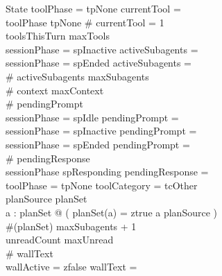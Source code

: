\documentclass[a4paper,10pt,fleqn]{article}
\begin{document}
\begin{schema}{State}
  toolPhase = tpNone \implies currentTool = \emptyset \\
  toolPhase \neq tpNone \implies \# currentTool = 1 \\
  toolsThisTurn \leq maxTools \\
  sessionPhase = spInactive \implies activeSubagents = \emptyset \\
  sessionPhase = spEnded \implies activeSubagents = \emptyset \\
  \# activeSubagents \leq maxSubagents \\
  \# context \leq maxContext \\
  \# pendingPrompt  \\
  sessionPhase = spIdle \implies pendingPrompt = \emptyset \\
  sessionPhase = spInactive \implies pendingPrompt = \emptyset \\
  sessionPhase = spEnded \implies pendingPrompt = \emptyset \\
  \# pendingResponse  \\
  sessionPhase \neq spResponding \implies pendingResponse = \emptyset \\
  toolPhase = tpNone \implies toolCategory = tcOther \\
  \dom planSource \subseteq \dom planSet \\
  \forall a : \dom planSet @ ( planSet(a) = ztrue \iff a \in \dom planSource ) \\
  \#(\dom planSet) \leq maxSubagents + 1 \\
  unreadCount \leq maxUnread \\
  \# wallText  \\
  wallActive = zfalse \implies wallText = \emptyset \\

\end{schema}
\end{document}
